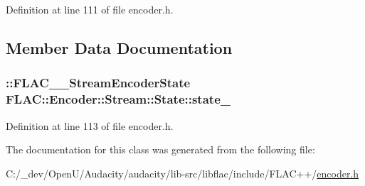 Definition at line 111 of file encoder.\+h.



\subsection{Member Data Documentation}
\subsubsection[{\texorpdfstring{state\+\_\+}{state_}}]{\setlength{\rightskip}{0pt plus 5cm}\+::{\bf F\+L\+A\+C\+\_\+\+\_\+\+Stream\+Encoder\+State} F\+L\+A\+C\+::\+Encoder\+::\+Stream\+::\+State\+::state\+\_\+\hspace{0.3cm}{\ttfamily [protected]}}\hypertarget{class_f_l_a_c_1_1_encoder_1_1_stream_1_1_state_af6d7a77454f9a33c813ade45f95dad8c}{}\label{class_f_l_a_c_1_1_encoder_1_1_stream_1_1_state_af6d7a77454f9a33c813ade45f95dad8c}


Definition at line 113 of file encoder.\+h.



The documentation for this class was generated from the following file\+:\begin{DoxyCompactItemize}
\item 
C\+:/\+\_\+dev/\+Open\+U/\+Audacity/audacity/lib-\/src/libflac/include/\+F\+L\+A\+C++/\hyperlink{encoder_8h}{encoder.\+h}\end{DoxyCompactItemize}
